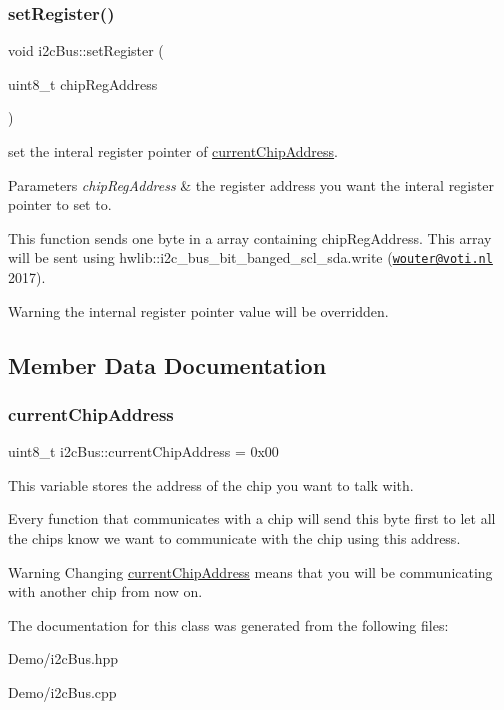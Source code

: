 \subsubsection{\texorpdfstring{set\+Register()}{setRegister()}}
{\footnotesize\ttfamily void i2c\+Bus\+::set\+Register (\begin{DoxyParamCaption}\item[{uint8\+\_\+t}]{chip\+Reg\+Address }\end{DoxyParamCaption})}



set the interal register pointer of \mbox{\hyperlink{classi2c_bus_a64ff87527c88619d72ede947d73eac3a}{current\+Chip\+Address}}. 


\begin{DoxyParams}{Parameters}
{\em chip\+Reg\+Address} & the register address you want the interal register pointer to set to.\\
\hline
\end{DoxyParams}
This function sends one byte in a array containing chip\+Reg\+Address. This array will be sent using hwlib\+::i2c\+\_\+bus\+\_\+bit\+\_\+banged\+\_\+scl\+\_\+sda.\+write (\href{mailto:wouter@voti.nl}{\tt wouter@voti.\+nl} 2017). \begin{DoxyWarning}{Warning}
the internal register pointer value will be overridden. 
\end{DoxyWarning}


\subsection{Member Data Documentation}
\mbox{\label{classi2c_bus_a64ff87527c88619d72ede947d73eac3a}} 
\subsubsection{\texorpdfstring{current\+Chip\+Address}{currentChipAddress}}
{\footnotesize\ttfamily uint8\+\_\+t i2c\+Bus\+::current\+Chip\+Address = 0x00\hspace{0.3cm}{\ttfamily [private]}}



This variable stores the address of the chip you want to talk with. 

Every function that communicates with a chip will send this byte first to let all the chips know we want to communicate with the chip using this address. \begin{DoxyWarning}{Warning}
Changing \mbox{\hyperlink{classi2c_bus_a64ff87527c88619d72ede947d73eac3a}{current\+Chip\+Address}} means that you will be communicating with another chip from now on. 
\end{DoxyWarning}


The documentation for this class was generated from the following files\+:\begin{DoxyCompactItemize}
\item 
Demo/i2c\+Bus.\+hpp\item 
Demo/i2c\+Bus.\+cpp\end{DoxyCompactItemize}
